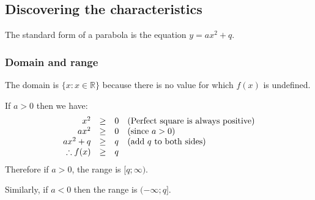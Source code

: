 

\subsection*{Discovering the characteristics}
The standard form of a parabola is the equation $y=ax^{2} + q$.
\subsubsection*{Domain and range}

The domain is $\{x:x\in \mathbb{R}\}$ because there is no value for which $f(x)$ is undefined.\par 
\par 
If $a>0$ then we have:
\begin{equation*}
\begin{array}{cccl}\hfill {x}^{2}& \geq & 0\hfill & (\mbox{Perfect square is always positive})\hfill \\
 \hfill a{x}^{2}& \geq & 0\hfill & (\mbox{since } a>0)\hfill \\
 \hfill a{x}^{2}+q& \geq & q\hfill & (\mbox{add $q$ to both sides}) \\
 \hfill \therefore f(x)& \geq & q\hfill & 
\end{array}
\end{equation*}
Therefore if $a>0$, the range is $[q; \infty )$.

Similarly, if $a<0$ then the range is $ (-\infty; q]$. 

